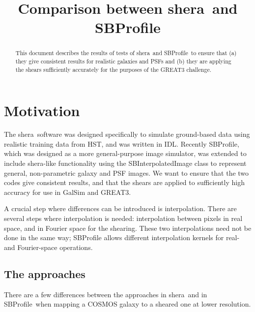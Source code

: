 \documentclass[preprint]{aastex}
\newcommand{\shera}{{\sc shera}}
\newcommand{\sbp}{SBProfile}
\begin{document}
\title{Comparison between \shera\ and \sbp}

\begin{abstract}
This document describes the results of tests of \shera\ and \sbp\ to
ensure that (a) they give consistent results for realistic galaxies
and PSFs and (b) they are applying the shears sufficiently accurately
for the purposes of the GREAT3 challenge.
\end{abstract}

\section{Motivation}

The \shera\ software was designed specifically to simulate 
ground-based data using realistic training data from HST, and was
written in IDL.  Recently \sbp, which was designed as a more
general-purpose image simulator, was extended to include \shera-like
functionality using the SBInterpolatedImage class to represent general, non-parametric galaxy and
PSF images.  We
want to ensure that the two codes give consistent results, and that
the shears are applied to sufficiently high accuracy for use in GalSim
and GREAT3.

A crucial step where differences can be introduced is interpolation.
There are several steps where interpolation is needed: interpolation
between pixels in real space, and in Fourier
space for the shearing.   These two interpolations need not be done in
the same way; SBProfile allows different interpolation kernels for
real- and Fourier-space operations.

\subsection{The approaches}

There are a few differences between the approaches in \shera\ and in
\sbp\ when mapping a COSMOS galaxy to a sheared one at lower
resolution.  
\end{document}
